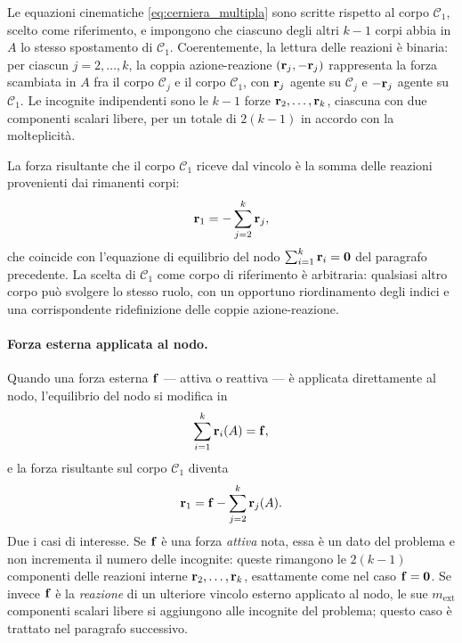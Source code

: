 
\begin{oss}
	Le equazioni cinematiche \eqref{eq:cerniera_multipla}
	sono scritte rispetto al corpo $\mathcal{C}_1$, scelto
	come riferimento, e impongono che ciascuno degli altri
	$k-1$ corpi abbia in $A$ lo stesso spostamento di
	$\mathcal{C}_1$. Coerentemente, la lettura delle reazioni
	è binaria: per ciascun $j = 2, \ldots, k$, la coppia
	azione-reazione $(\mathbf{r}_j, -\mathbf{r}_j)$ rappresenta la forza
	scambiata in $A$ fra il corpo $\mathcal{C}_j$ e il corpo
	$\mathcal{C}_1$, con $\mathbf{r}_j$ agente su $\mathcal{C}_j$ e
	$-\mathbf{r}_j$ agente su $\mathcal{C}_1$. Le incognite
	indipendenti sono le $k-1$ forze $\mathbf{r}_2, \ldots, \mathbf{r}_k$,
	ciascuna con due componenti scalari libere, per un totale
	di $2(k-1)$ in accordo con la molteplicità.
	
	La forza risultante che il corpo $\mathcal{C}_1$ riceve
	dal vincolo è la somma delle reazioni provenienti dai
	rimanenti corpi:
	\begin{equation}\label{eq:cerniera_multipla_r1}
		\mathbf{r}_1 = -\sum_{j=2}^{k} \mathbf{r}_j,
	\end{equation}
	che coincide con l'equazione di equilibrio del nodo
	$\sum_{i=1}^{k} \mathbf{r}_i = \mathbf{0}$ del paragrafo
	precedente. La scelta di $\mathcal{C}_1$ come corpo di
	riferimento è arbitraria: qualsiasi altro corpo può
	svolgere lo stesso ruolo, con un opportuno
	riordinamento degli indici e una corrispondente
	ridefinizione delle coppie azione-reazione.
\end{oss}

\paragraph{Forza esterna applicata al nodo.}
Quando una forza esterna $\mathbf{f}$ --- attiva o reattiva --- è
applicata direttamente al nodo, l'equilibrio del nodo si
modifica in
\begin{equation}\label{eq:eq_nodo_F}
	\sum_{i=1}^{k} \mathbf{r}_i(A) = \mathbf{f},
\end{equation}
e la forza risultante sul corpo $\mathcal{C}_1$ diventa
\begin{equation}
	\mathbf{r}_1 = \mathbf{f} - \sum_{j=2}^{k} \mathbf{r}_j(A).
\end{equation}
Due i casi di interesse. Se $\mathbf{f}$ è una forza
\emph{attiva} nota, essa è un dato del problema e non
incrementa il numero delle incognite: queste rimangono le
$2(k-1)$ componenti delle reazioni interne $\mathbf{r}_2, \ldots,
\mathbf{r}_k$, esattamente come nel caso $\mathbf{f} = \mathbf{0}$. Se
invece $\mathbf{f}$ è la \emph{reazione} di un ulteriore vincolo
esterno applicato al nodo, le sue $m_\text{ext}$
componenti scalari libere si aggiungono alle incognite
del problema; questo caso è trattato nel paragrafo
successivo.



